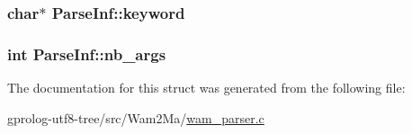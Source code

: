 \subsubsection[{\texorpdfstring{keyword}{keyword}}]{\setlength{\rightskip}{0pt plus 5cm}char$\ast$ Parse\+Inf\+::keyword}\hypertarget{structParseInf_affadb424830268d2231588e867b1fb40}{}\label{structParseInf_affadb424830268d2231588e867b1fb40}
\subsubsection[{\texorpdfstring{nb\+\_\+args}{nb_args}}]{\setlength{\rightskip}{0pt plus 5cm}int Parse\+Inf\+::nb\+\_\+args}\hypertarget{structParseInf_abb84b55b8b29fe0bccf151d7400f0d9d}{}\label{structParseInf_abb84b55b8b29fe0bccf151d7400f0d9d}


The documentation for this struct was generated from the following file\+:\begin{DoxyCompactItemize}
\item 
gprolog-\/utf8-\/tree/src/\+Wam2\+Ma/\hyperlink{wam__parser_8c}{wam\+\_\+parser.\+c}\end{DoxyCompactItemize}

